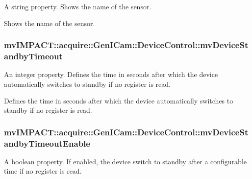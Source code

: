 A string property. Shows the name of the sensor. 

Shows the name of the sensor. \hypertarget{classmv_i_m_p_a_c_t_1_1acquire_1_1_gen_i_cam_1_1_device_control_a1ffcd2e5c7d071fa6a7ea61cdeb8ccfe}{
\subsubsection[{mv\+Device\+Standby\+Timeout}]{ mv\+I\+M\+P\+A\+C\+T\+::acquire\+::\+Gen\+I\+Cam\+::\+Device\+Control\+::mv\+Device\+Standby\+Timeout}}\label{classmv_i_m_p_a_c_t_1_1acquire_1_1_gen_i_cam_1_1_device_control_a1ffcd2e5c7d071fa6a7ea61cdeb8ccfe}


An integer property. Defines the time in seconds after which the device automatically switches to standby if no register is read. 

Defines the time in seconds after which the device automatically switches to standby if no register is read. \hypertarget{classmv_i_m_p_a_c_t_1_1acquire_1_1_gen_i_cam_1_1_device_control_a18e2fcf8bade18c057a02002aa42379b}{
\subsubsection[{mv\+Device\+Standby\+Timeout\+Enable}]{ mv\+I\+M\+P\+A\+C\+T\+::acquire\+::\+Gen\+I\+Cam\+::\+Device\+Control\+::mv\+Device\+Standby\+Timeout\+Enable}}\label{classmv_i_m_p_a_c_t_1_1acquire_1_1_gen_i_cam_1_1_device_control_a18e2fcf8bade18c057a02002aa42379b}


A boolean property. If enabled, the device switch to standby after a configurable time if no register is read. 

